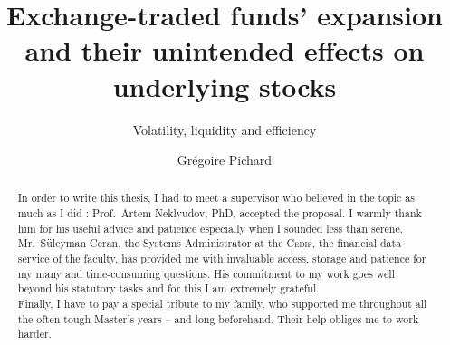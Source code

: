 \documentclass[a4paper, oneside, 10pt, titlepage, abstracton, captions = tableheading]{scrartcl}
\title{Exchange-traded funds' expansion and their unintended effects on underlying stocks}
\subtitle{Volatility, liquidity and efficiency}
\date{\DTMdisplaydate{2019}{6}{28}{}}
\author{Grégoire Pichard}
\begin{document}
\maketitle
{\renewcommand{\abstractname}{\vspace{-\baselineskip}}
\begin{abstract}
  In order to write this thesis, I had to meet a supervisor who believed in the topic as much as I did : Prof.~Artem Neklyudov, PhD, accepted the proposal.  I warmly thank him for his useful advice and patience especially when I sounded less than serene.\\ Mr.~Süleyman Ceran, the Systems Administrator at the \textsc{Cedif}, the financial data service of the faculty, has provided me with invaluable access, storage and patience for my many and time-consuming questions. His commitment to my work goes well beyond his statutory tasks and for this I am extremely grateful.\\[2\baselineskip] Finally, I have to pay a special tribute to my family, who supported me throughout all the often tough Master's years -- and long beforehand. Their help obliges me to work harder.
\end{abstract}
}

\renewcommand{\sectionautorefname}{Section}
\tableofcontents
\listoftables
\listoffigures
\clearpage

\clearpage

\clearpage

\clearpage

\clearpage

\clearpage

\clearpage

\clearpage
\printbibliography
\clearpage
\begin{appendices}



\end{appendices}
\end{document}
